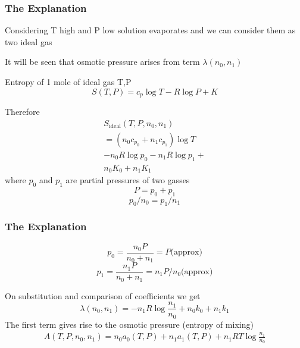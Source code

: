 \documentclass{beamer}
\begin{document}
		\begin{frame}
		\frametitle{The Explanation}
			Considering T high and P low solution evaporates and we can consider them as two ideal gas

			It will be seen that osmotic pressure arises from term $\lambda (n_0,n_1)$

			Entropy of 1 mole of ideal gas T,P
			\begin{equation}
				S(T,P) = c_p \log T - R \log P + K
			\end{equation}

			Therefore
			\begin{align}
				S_{\text{ideal}}(T,P,n_0,n_1) \\
				 = ( n_0 c_{p_0} + n_1 c_{p_1} )\log T \\
				 - n_0 R \log p_0 - n_1 R \log p_1 + \\
				  n_0 K_0 + n_1K_1
			\end{align}
			where $p_0$ and $p_1$ are partial pressures of two gasses
			\begin{equation}
				P=p_0 + p_1
			\end{equation}
			\begin{equation}
				p_0/n_0 = p_1/n_1
			\end{equation}
		\end{frame}

		\begin{frame}
		\frametitle{The Explanation}
			\begin{equation}
				p_0=\frac {n_0 P} {n_0 + n_1} = P \text{(approx)}
			\end{equation}
			\begin{equation}
				p_1=\frac {n_1 P} {n_0 + n_1} = n_1 P/n_0 \text{(approx)}
			\end{equation}

			On substitution and comparison of coefficients we get
			\begin{equation}
				\lambda (n_0,n_1) = -n_1 R \log {\frac {n_1} {n_0}} + n_0 k_0 + n_1k_1
			\end{equation}
			The first term gives rise to the osmotic pressure (entropy of mixing)
			\begin{align}
				A(T,P,n_0,n_1) = n_0a_0 (T,P) + n_1a_1(T,P) + n_1RT\log {\frac{n_1}{n_0}}
			\end{align}
		\end{frame}


\end{document}
